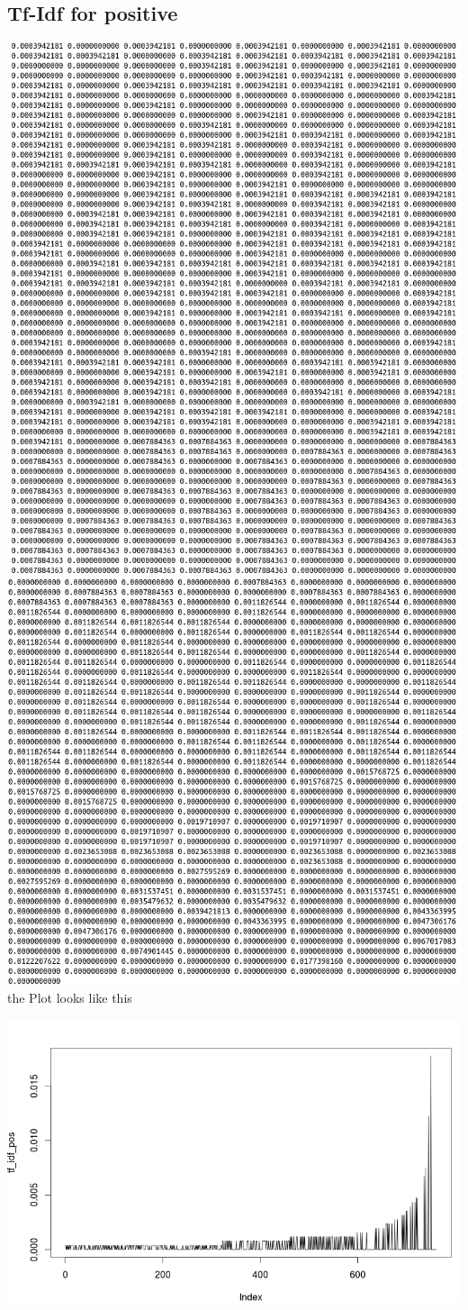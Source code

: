 \documentclass{article}
\begin{document}
\subsection{Tf-Idf for positive}
\includegraphics[width=0.8\linewidth]{tf_idf_pos1.png}\\
\includegraphics[width=0.8\linewidth]{tf_idf_pos2.png}\\
the Plot looks like this

\includegraphics[width=0.8\linewidth]{tf_idf_pos3.png}
\end{document}
